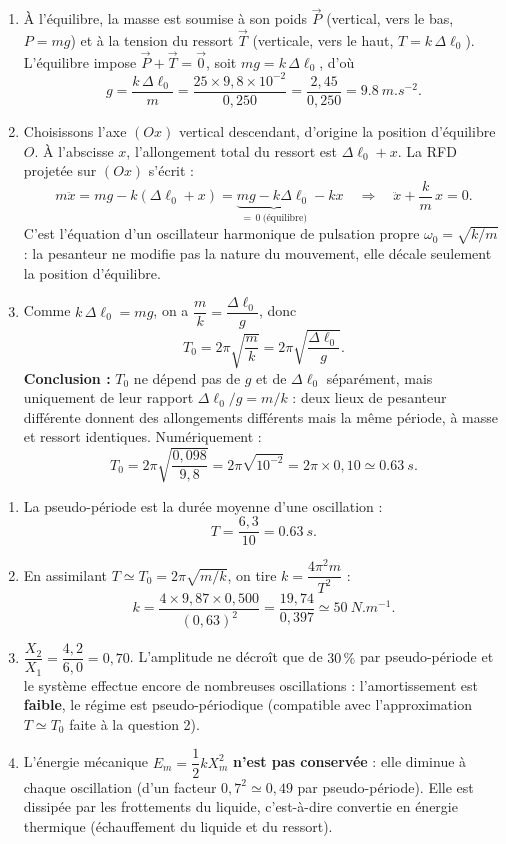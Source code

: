 \documentclass[11pt]{article}
\newcommand{\cle}[1]{{\popxbold\color{popdark}#1}}
\begin{document}
\begin{corrige}
\begin{enumerate}
\item À l'équilibre, la masse est soumise à son poids $\vec{P}$ (vertical, vers le bas, $P = mg$) et à la tension du ressort $\vec{T}$ (verticale, vers le haut, $T = k\,\Delta\ell_0$). L'équilibre impose $\vec{P}+\vec{T}=\vec{0}$, soit $mg = k\,\Delta\ell_0$, d'où
\[ g = \dfrac{k\,\Delta\ell_0}{m} = \dfrac{25\times 9{,}8\times 10^{-2}}{0{,}250} = \dfrac{2{,}45}{0{,}250} = \SI{9,8}{m.s^{-2}}. \]
\item Choisissons l'axe $(Ox)$ vertical descendant, d'origine la position d'équilibre $O$. À l'abscisse $x$, l'allongement total du ressort est $\Delta\ell_0 + x$. La RFD projetée sur $(Ox)$ s'écrit :
\[ m\ddot{x} = mg - k(\Delta\ell_0 + x) = \underbrace{mg - k\Delta\ell_0}_{=\,0\ \text{(équilibre)}} - kx \quad\Longrightarrow\quad \boxed{\ddot{x} + \dfrac{k}{m}\,x = 0}. \]
C'est l'équation d'un oscillateur harmonique de pulsation propre $\omega_0 = \sqrt{k/m}$ : la pesanteur ne modifie pas la nature du mouvement, elle décale seulement la position d'équilibre.
\item Comme $k\,\Delta\ell_0 = mg$, on a $\dfrac{m}{k} = \dfrac{\Delta\ell_0}{g}$, donc
\[ T_0 = 2\pi\sqrt{\dfrac{m}{k}} = 2\pi\sqrt{\dfrac{\Delta\ell_0}{g}}. \]
\textbf{Conclusion :} $T_0$ ne dépend pas de $g$ et de $\Delta\ell_0$ séparément, mais uniquement de leur rapport $\Delta\ell_0/g = m/k$ : deux lieux de pesanteur différente donnent des allongements différents mais la même période, à masse et ressort identiques. Numériquement :
\[ T_0 = 2\pi\sqrt{\dfrac{0{,}098}{9{,}8}} = 2\pi\sqrt{10^{-2}} = 2\pi\times 0{,}10 \simeq \SI{0,63}{s}. \]
\end{enumerate}
\end{corrige}

\begin{corrige}
\begin{enumerate}
\item La pseudo-période est la durée moyenne d'une oscillation :
\[ T = \dfrac{6{,}3}{10} = \SI{0,63}{s}. \]
\item En assimilant $T \simeq T_0 = 2\pi\sqrt{m/k}$, on tire $k = \dfrac{4\pi^2 m}{T^2}$ :
\[ k = \dfrac{4\times 9{,}87\times 0{,}500}{(0{,}63)^2} = \dfrac{19{,}74}{0{,}397} \simeq \SI{50}{N.m^{-1}}. \]
\item $\dfrac{X_2}{X_1} = \dfrac{4{,}2}{6{,}0} = 0{,}70$. L'amplitude ne décroît que de $30\,\%$ par pseudo-période et le système effectue encore de nombreuses oscillations : l'amortissement est \textbf{faible}, le régime est \cle{pseudo-périodique} (compatible avec l'approximation $T \simeq T_0$ faite à la question 2).
\item L'énergie mécanique $E_m = \dfrac{1}{2}kX_m^2$ \textbf{n'est pas conservée} : elle diminue à chaque oscillation (d'un facteur $0{,}7^2 \simeq 0{,}49$ par pseudo-période). Elle est dissipée par les frottements du liquide, c'est-à-dire convertie en \cle{énergie thermique} (échauffement du liquide et du ressort).
\end{enumerate}
\end{corrige}
\end{document}
